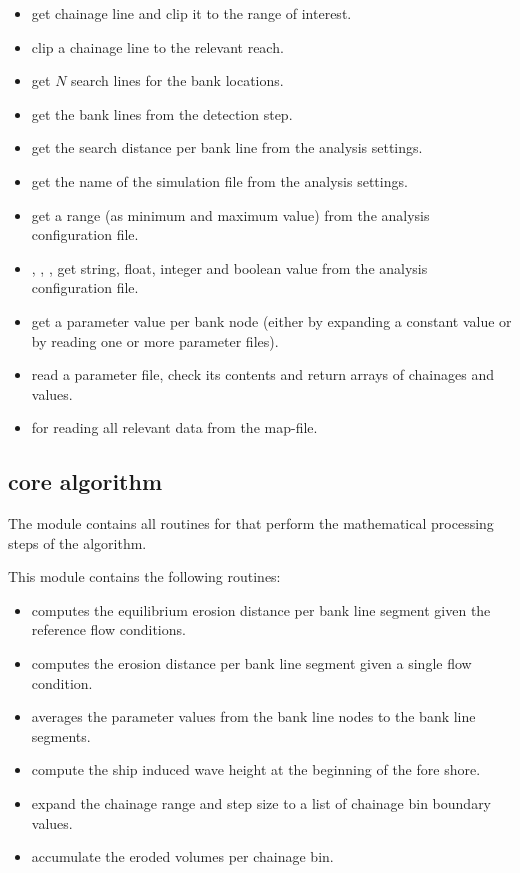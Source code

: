 \begin{itemize}
\item {} get chainage line and clip it to the range of interest.
\item {} clip a chainage line to the relevant reach.
\item {} get $N$ search lines for the bank locations.
\item {} get the bank lines from the detection step.
\item {} get the search distance per bank line from the analysis settings.
\item {} get the name of the simulation file from the analysis settings.
\item {} get a range (as minimum and maximum value) from the analysis configuration file.
\item {}, , ,  get string, float, integer and boolean value from the analysis configuration file.
\item {} get a parameter value per bank node (either by expanding a constant value or by reading one or more parameter files).
\item {} read a parameter file, check its contents and return arrays of chainages and values.
\item {} for reading all relevant data from the \dflowfm map-file.
\end{itemize}

\subsection{core algorithm }

The  module contains all routines for that perform the mathematical processing steps of the algorithm.

This module contains the following routines:

\begin{itemize}
\item {} computes the equilibrium erosion distance per bank line segment given the reference flow conditions.
\item {} computes the erosion distance per bank line segment given a single flow condition.
\item {} averages the parameter values from the bank line nodes to the bank line segments.
\item {} compute the ship induced wave height at the beginning of the fore shore.
\item {} expand the chainage range and step size to a list of chainage bin boundary values.
\item {} accumulate the eroded volumes per chainage bin.
\end{itemize}

